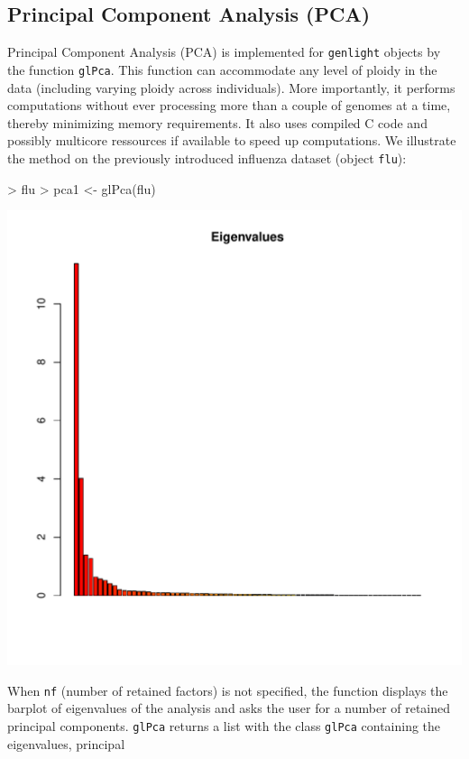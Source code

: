 \documentclass{article}
\begin{document}
\subsection{Principal Component Analysis (PCA)}
Principal Component Analysis (PCA) is implemented for \texttt{genlight} objects by the function \texttt{glPca}.
This function can accommodate any level of ploidy in the data (including varying ploidy across
individuals). More importantly, it performs computations without ever processing more than a
couple of genomes at a time, thereby minimizing memory requirements.
It also uses compiled C code and possibly multicore ressources if available to speed up computations.
We illustrate the method on the previously introduced influenza dataset (object \texttt{flu}):
\begin{Schunk}
\begin{Sinput}
> flu
> pca1 <- glPca(flu)
\end{Sinput}
\end{Schunk}
\begin{center}
  \includegraphics{figs/pca1}
\end{center}
When \texttt{nf} (number of retained factors) is not specified, the function displays the barplot of
eigenvalues of the analysis and asks the user for a number of retained principal components.
\texttt{glPca} returns a list with the class \texttt{glPca} containing the eigenvalues, principal
\end{document}
